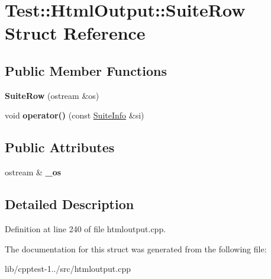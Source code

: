 \hypertarget{struct_test_1_1_html_output_1_1_suite_row}{}\section{Test\+:\+:Html\+Output\+:\+:Suite\+Row Struct Reference}
\label{struct_test_1_1_html_output_1_1_suite_row}
\subsection*{Public Member Functions}
\begin{DoxyCompactItemize}
\item 
{\bfseries Suite\+Row} (ostream \&os)\hypertarget{struct_test_1_1_html_output_1_1_suite_row_aaa5f27c2da8cbbcb935d3488d4e7c761}{}\label{struct_test_1_1_html_output_1_1_suite_row_aaa5f27c2da8cbbcb935d3488d4e7c761}

\item 
void {\bfseries operator()} (const \hyperlink{struct_test_1_1_collector_output_1_1_suite_info}{Suite\+Info} \&si)\hypertarget{struct_test_1_1_html_output_1_1_suite_row_a17a452a03a365411190d5da93b5db2d4}{}\label{struct_test_1_1_html_output_1_1_suite_row_a17a452a03a365411190d5da93b5db2d4}

\end{DoxyCompactItemize}
\subsection*{Public Attributes}
\begin{DoxyCompactItemize}
\item 
ostream \& {\bfseries \+\_\+os}\hypertarget{struct_test_1_1_html_output_1_1_suite_row_a9424ee9c56deece0df65799d32ab6498}{}\label{struct_test_1_1_html_output_1_1_suite_row_a9424ee9c56deece0df65799d32ab6498}

\end{DoxyCompactItemize}


\subsection{Detailed Description}


Definition at line 240 of file htmloutput.\+cpp.



The documentation for this struct was generated from the following file\+:\begin{DoxyCompactItemize}
\item 
lib/cpptest-\/1../src/htmloutput.\+cpp\end{DoxyCompactItemize}
